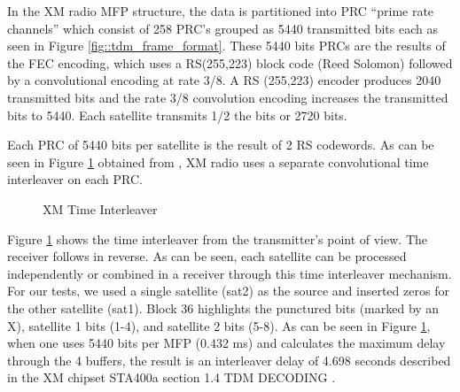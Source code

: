 \documentclass[conference,onecolumn]{IEEEtran}
\begin{document}
In the XM radio MFP structure, the data is partitioned into PRC ``prime rate channels'' which consist of 258 PRC's grouped as 5440 transmitted bits each as seen in Figure \ref{fig::tdm_frame_format}.  These 5440 bits PRCs are the results of the FEC encoding, which uses a RS(255,223) block code (Reed Solomon) followed by a convolutional encoding at rate 3/8.  A RS (255,223) encoder produces 2040 transmitted bits and the rate 3/8 convolution encoding increases the transmitted bits to 5440.  Each satellite transmits 1/2 the bits or 2720 bits. 


Each PRC of 5440 bits per satellite is the result of 2 RS codewords.  As can be seen in Figure \ref{fig::time_interleaver} obtained from \cite{marko_2012_us8667344b2}, XM radio uses a separate convolutional time interleaver on each PRC.

\begin{figure}[H]
	\centerline{}
	\caption{XM Time Interleaver \cite{marko_2012_us8667344b2}}
	\label{fig::time_interleaver}
\end{figure}


Figure \ref{fig::time_interleaver} shows the time interleaver from the transmitter's point of view.  The receiver follows in reverse. As can be seen, each satellite can be processed independently or combined in a receiver through this time interleaver mechanism.  For our tests, we used a single satellite (sat2) as the source and inserted zeros for the other satellite (sat1). Block 36 highlights the punctured bits (marked by an X), satellite 1 bits (1-4), and satellite 2 bits (5-8).  As can be seen in Figure \ref{fig::time_interleaver}, when one uses 5440 bits per MFP (0.432 ms) and calculates the maximum delay through the 4 buffers, the result is an interleaver delay of 4.698 seconds described in the XM chipset STA400a section 1.4 TDM DECODING \cite{alldatasheetcom_2015_sta400a}.
\end{document}
